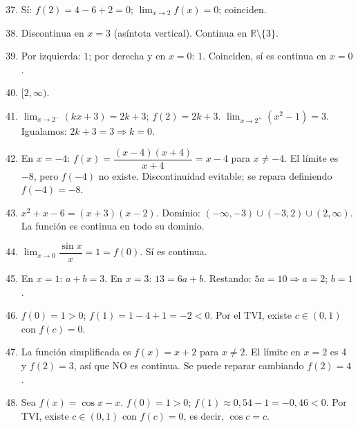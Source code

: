\documentclass[12pt, a4paper]{article}
\begin{document}
\begin{enumerate}[leftmargin=*, label=\textbf{\arabic*.}]
  \setcounter{enumi}{36}
  \item Sí: $f(2) = 4 - 6 + 2 = 0$; $\lim_{x \to 2} f(x) = 0$; coinciden.

  \item Discontinua en $x = 3$ (asíntota vertical). Continua en $\mathbb{R} \setminus \{3\}$.

  \item Por izquierda: $1$; por derecha y en $x = 0$: $1$. Coinciden, sí es continua en $x = 0$.

  \item $[2, \infty)$.

  \item $\lim_{x \to 2^-} (kx + 3) = 2k + 3$; $f(2) = 2k + 3$. $\lim_{x \to 2^+} (x^2 - 1) = 3$. Igualamos: $2k + 3 = 3 \Rightarrow k = 0$.

  \item En $x = -4$: $f(x) = \dfrac{(x - 4)(x + 4)}{x + 4} = x - 4$ para $x \neq -4$. El límite es $-8$, pero $f(-4)$ no existe. Discontinuidad evitable; se repara definiendo $f(-4) = -8$.

  \item $x^2 + x - 6 = (x + 3)(x - 2)$. Dominio: $(-\infty, -3) \cup (-3, 2) \cup (2, \infty)$. La función es continua en todo su dominio.

  \item $\lim_{x \to 0} \dfrac{\sin x}{x} = 1 = f(0)$. Sí es continua.

  \item En $x = 1$: $a + b = 3$. En $x = 3$: $13 = 6a + b$. Restando: $5a = 10 \Rightarrow a = 2$; $b = 1$.

  \item $f(0) = 1 > 0$; $f(1) = 1 - 4 + 1 = -2 < 0$. Por el TVI, existe $c \in (0, 1)$ con $f(c) = 0$.

  \item La función simplificada es $f(x) = x + 2$ para $x \neq 2$. El límite en $x = 2$ es 4 y $f(2) = 3$, así que NO es continua. Se puede reparar cambiando $f(2) = 4$.

  \item Sea $f(x) = \cos x - x$. $f(0) = 1 > 0$; $f(1) \approx 0{,}54 - 1 = -0{,}46 < 0$. Por TVI, existe $c \in (0, 1)$ con $f(c) = 0$, es decir, $\cos c = c$.
\end{enumerate}
\end{document}
